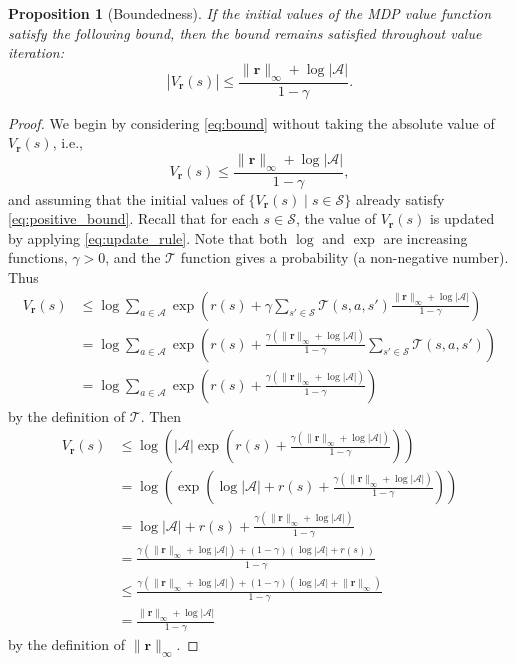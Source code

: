 \documentclass{mpaper}
\newtheorem{proposition}[theorem]{Proposition}
\newcommand{\V}{V_{\mathbf{r}}}
\newcommand{\vbound}{\frac{\rinf + \log|\mathcal{A}|}{1 - \gamma}}
\newcommand{\rinf}{\lVert \mathbf{r} \rVert_\infty}
\begin{document}
\begin{proposition}[Boundedness] \label{thm:bound}
  If the initial values of the MDP value function satisfy the following
  bound, then the bound remains satisfied throughout value iteration:
  \begin{equation} \label{eq:bound}
    |\V(s)| \le \vbound.
  \end{equation}
\end{proposition}
\begin{proof}
  We begin by considering \eqref{eq:bound} without taking the absolute value of
  $\V(s)$, i.e.,
  \begin{equation} \label{eq:positive_bound}
    \V(s) \le \vbound,
  \end{equation}
  and assuming that the initial values of $\{ \V(s) \mid s \in \mathcal{S} \}$
  already satisfy \eqref{eq:positive_bound}. Recall that for each $s \in
  \mathcal{S}$, the value of $\V(s)$ is updated by applying
  \eqref{eq:update_rule}. Note that both $\log$ and $\exp$ are increasing
  functions, $\gamma > 0$, and the $\mathcal{T}$ function gives a probability (a
  non-negative number). Thus
  \begin{align*}
    \V(s) &\le \log \sum_{a \in \mathcal{A}} \exp\left( r(s) + \gamma\sum_{s' \in \mathcal{S}} \mathcal{T}(s, a, s')\frac{\rinf + \log|\mathcal{A}|}{1 - \gamma} \right) \\
          &= \log \sum_{a \in \mathcal{A}} \exp\left( r(s) + \frac{\gamma (\rinf + \log|\mathcal{A}|)}{1 - \gamma}\sum_{s' \in \mathcal{S}} \mathcal{T}(s, a, s') \right) \\
          &= \log \sum_{a \in \mathcal{A}} \exp\left( r(s) + \frac{\gamma (\rinf + \log|\mathcal{A}|)}{1 - \gamma} \right)
  \end{align*}
  by the definition of $\mathcal{T}$. Then
  \begin{align*}
    \V(s) &\le \log \left( |\mathcal{A}| \exp\left( r(s) + \frac{\gamma (\rinf + \log|\mathcal{A}|)}{1 - \gamma} \right) \right) \\
          &= \log \left( \exp\left( \log|\mathcal{A}| + r(s) + \frac{\gamma (\rinf + \log|\mathcal{A}|)}{1 - \gamma} \right) \right) \\
          &= \log|\mathcal{A}| + r(s) + \frac{\gamma (\rinf + \log|\mathcal{A}|)}{1 - \gamma} \\
          &= \frac{\gamma (\rinf + \log|\mathcal{A}|) + (1 - \gamma)(\log|\mathcal{A}| + r(s))}{1 - \gamma} \\
          &\le \frac{\gamma (\rinf + \log|\mathcal{A}|) + (1 - \gamma)(\log|\mathcal{A}| + \rinf)}{1 - \gamma} \\
          &= \vbound
  \end{align*}
  by the definition of $\rinf$.


\end{proof}
\end{document}
